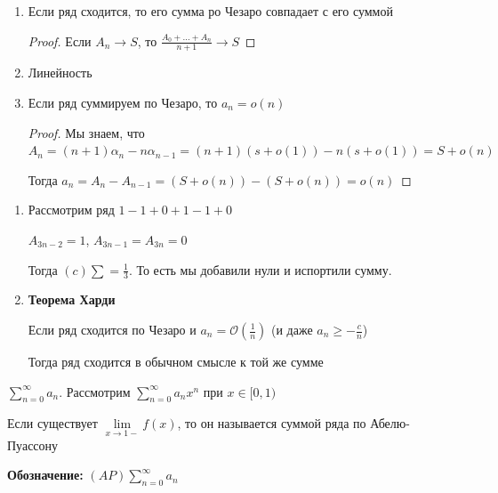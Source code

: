 \begin{properties}
    \begin{enumerate}
        \item {
            Если ряд сходится, то его сумма ро Чезаро совпадает с его суммой

            \begin{proof}
                Если $A_n \rightarrow S$, то $\frac{A_0 + \ldots + A_n}{n + 1} \rightarrow S$
            \end{proof}
        }
        \item {
            Линейность
        }
        \item {
            Если ряд суммируем по Чезаро, то $a_n = o(n)$
            
            \begin{proof}
                Мы знаем, что $A_n = (n + 1)\alpha_n - n\alpha_{n-1} = (n + 1)(s + o(1)) - n(s + o(1)) = S + o(n)$

                Тогда $a_n = A_n - A_{n - 1} = (S + o(n)) - (S + o(n)) = o(n)$
            \end{proof}
        }
    \end{enumerate}
\end{properties}

\begin{remark}
    \begin{enumerate}
        \item {
            Рассмотрим ряд $1 - 1 + 0 + 1 - 1 + 0$

            $A_{3n - 2} = 1$, $A_{3n - 1} = A_{3n} = 0$

            Тогда $(c) \sum = \frac{1}{3}$. То есть мы добавили нули и испортили сумму. 
        }
        \item {
            \textbf{Теорема Харди}

            Если ряд сходится по Чезаро и $a_n = \mathcal{O} \left(\frac{1}{n} \right)$ (и даже $a_n \geqslant -\frac{c}{n}$)

            Тогда ряд сходится в обычном смысле к той же сумме
        }
    \end{enumerate}
\end{remark}

\begin{definition}
    $\sum\limits_{n=0}^\infty a_n$. Рассмотрим $\sum\limits_{n=0}^\infty a_nx^n$ при $x \in [0, 1)$

    Если существует $\lim\limits_{x \to 1-} f(x)$, то он называется суммой ряда по Абелю-Пуассону

    \textbf{Обозначение:} $(AP) \sum\limits_{n=0}^\infty a_n$
\end{definition}

